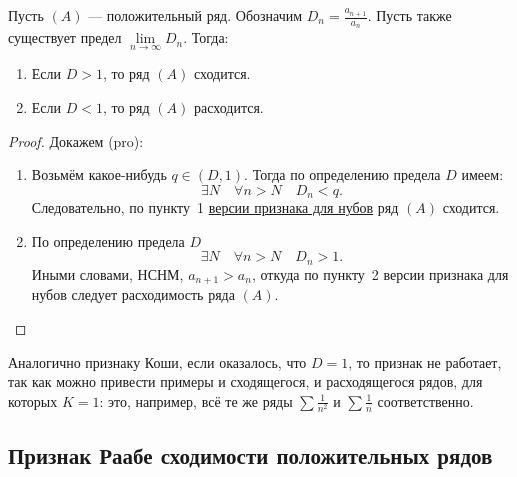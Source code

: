 \begin{theorem}[pro]
	Пусть \((A)\) --- положительный ряд. Обозначим \linebreak \(D_n = \frac{a_{n+1}}{a_n}\). Пусть также существует предел \(\lim\limits_{n \to \infty} D_n\). Тогда:
	\begin{enumerate}
		\item Если \(D > 1\), то ряд \((A)\) сходится.
		\item Если \(D < 1\), то ряд \((A)\) расходится.
	\end{enumerate}
\end{theorem}
\begin{proof}
	Докажем (pro):
	\begin{enumerate}
		\item Возьмём какое-нибудь \(q \in (D, 1)\). Тогда по определению предела \(D\) имеем: \[
			\exists N \quad \forall n > N \quad D_n < q.
		\]
		Следовательно, по пункту~1 \hyperlink{Даламбер-нуб}{версии признака для нубов} ряд \((A)\) сходится.
		\item По определению предела  \(D\) \[
			\exists N \quad \forall n > N \quad D_n > 1.
		\]
		Иными словами, НСНМ,  \(a_{n+1} > a_n\), откуда по пункту~2 версии признака для нубов следует расходимость ряда \((A)\).
	\end{enumerate}
\end{proof}

\begin{remark}
	Аналогично признаку Коши, если оказалось, что \(D = 1\), то признак не работает, так как можно привести примеры и сходящегося, и расходящегося рядов, для которых \(K = 1\): это, например, всё те же ряды \(\sum \frac{1}{n^2}\) и \(\sum \frac{1}{n}\) соответственно.
\end{remark}

\subsection{Признак Раабе сходимости положительных рядов}

